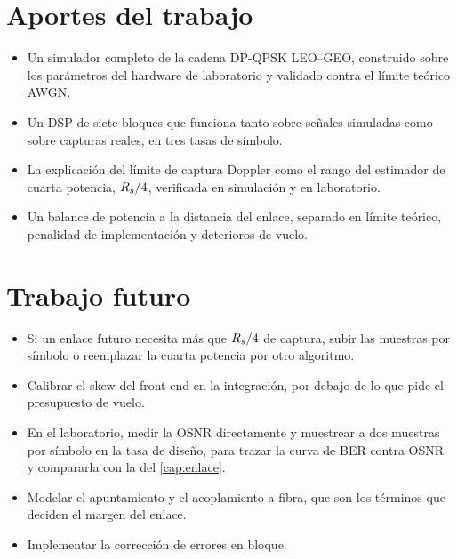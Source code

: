 \section{Aportes del trabajo}
\label{sec:con-aportes}

\begin{itemize}
  \item Un simulador completo de la cadena DP-QPSK LEO--GEO, construido sobre
        los par\'ametros del hardware de laboratorio y validado contra el
        l\'imite te\'orico AWGN.
  \item Un DSP de siete bloques que funciona tanto sobre se\~nales simuladas como
        sobre capturas reales, en tres tasas de s\'imbolo.
  \item La explicaci\'on del l\'imite de captura Doppler como el rango del
        estimador de cuarta potencia, $R_{s}/4$, verificada en simulaci\'on y en
        laboratorio.
  \item Un balance de potencia a la distancia del enlace, separado en l\'imite
        te\'orico, penalidad de implementaci\'on y deterioros de vuelo.
\end{itemize}

\section{Trabajo futuro}
\label{sec:con-futuro}

\begin{itemize}
  \item Si un enlace futuro necesita m\'as que $R_{s}/4$ de captura, subir las
        muestras por s\'imbolo o reemplazar la
        cuarta potencia por otro algoritmo.
  \item Calibrar el skew del front end en la integraci\'on, por debajo de lo
        que pide el presupuesto de vuelo.
  \item En el laboratorio, medir la OSNR directamente y muestrear a dos
        muestras por s\'imbolo en la tasa de dise\~no, para trazar la curva de
        BER contra OSNR y compararla con la del \cref{cap:enlace}.
  \item Modelar el apuntamiento y el acoplamiento a fibra, que son los
        t\'erminos que deciden el margen del enlace.
  \item Implementar la correcci\'on de errores en bloque.
\end{itemize}
